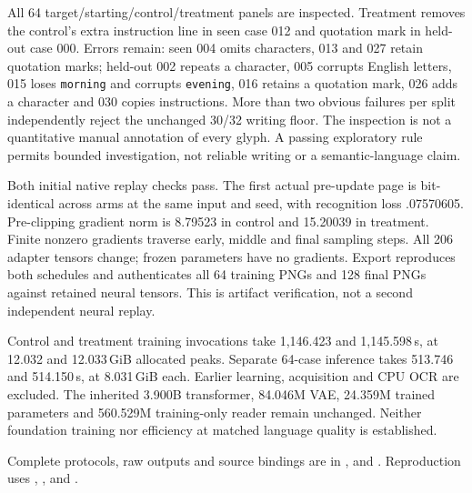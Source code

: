 All 64 target/starting/control/treatment panels are inspected. Treatment removes
the control's extra instruction line in seen case 012 and quotation mark in
held-out case 000. Errors remain: seen 004 omits characters, 013 and 027 retain
quotation marks; held-out 002 repeats a character, 005 corrupts English letters,
015 loses \texttt{morning} and corrupts \texttt{evening}, 016 retains a quotation
mark, 026 adds a character and 030 copies instructions. More than two obvious
failures per split independently reject the unchanged 30/32 writing floor.
The inspection is not a quantitative manual annotation of every glyph. A
passing exploratory rule permits bounded investigation, not reliable writing
or a semantic-language claim.

Both initial native replay checks pass. The first actual pre-update page is
bit-identical across arms at the same input and seed, with recognition loss
.07570605. Pre-clipping gradient norm is 8.79523 in control and 15.20039 in
treatment. Finite nonzero gradients traverse early, middle and final sampling
steps. All 206 adapter tensors change; frozen parameters have no gradients.
Export reproduces both schedules and authenticates all 64 training PNGs and
128 final PNGs against retained neural tensors. This is artifact verification,
not a second independent neural replay.

Control and treatment training invocations take 1,146.423 and 1,145.598\,s,
at 12.032 and 12.033\,GiB allocated peaks. Separate 64-case inference takes
513.746 and 514.150\,s, at 8.031\,GiB each. Earlier learning, acquisition and
CPU OCR are excluded. The inherited 3.900B transformer, 84.046M VAE, 24.359M
trained parameters and 560.529M training-only reader remain unchanged. Neither
foundation training nor efficiency at matched language quality is established.

{\footnotesize\raggedright
Complete protocols, raw outputs and source bindings are in
,
 and
.
Reproduction uses ,
,
 and
.\par}

\clearpage
{}
